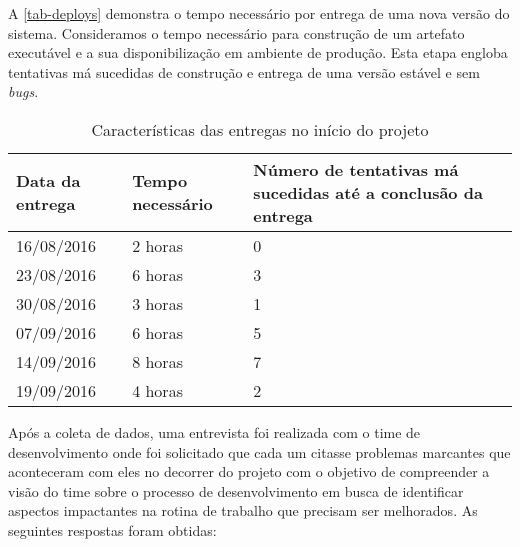 \documentclass[
	12pt,				%
	openright,			%
	oneside,			%
	a4paper,			%
	english,			%
	french,				%
	spanish,			%
	brazil,				%
	]{abntex2}
\begin{document}
A \autoref{tab-deploys} demonstra o tempo necessário por entrega de uma nova versão do sistema. Consideramos o tempo necessário para construção de um artefato executável e a sua disponibilização em ambiente de produção. Esta etapa engloba tentativas má sucedidas de construção e entrega de uma versão estável e sem \textit{bugs}.

\begin{table}[htb]
	\caption{Características das entregas no início do projeto}
	
	\label{tab-deploys}	
	\begin{tabular}{p{3.85cm}|p{5.20cm}|p{5.20cm}}
		\textbf{Data da entrega} & \textbf{Tempo necessário} & \textbf{Número de tentativas má sucedidas até a conclusão da entrega}  \\
		\hline
		16/08/2016 & 2 horas & 0 \\
		\hline
		23/08/2016 & 6 horas & 3 \\
		\hline
		30/08/2016 & 3 horas & 1 \\
		\hline
		07/09/2016 & 6 horas & 5 \\
		\hline
		14/09/2016 & 8 horas & 7 \\
		\hline
		19/09/2016 & 4 horas & 2 \\
	\end{tabular}
\end{table}

Após a coleta de dados, uma entrevista foi realizada com o time de desenvolvimento onde foi solicitado que cada um citasse problemas marcantes que aconteceram com eles no decorrer do projeto com o objetivo de compreender a visão do time sobre o processo de desenvolvimento em busca de identificar aspectos impactantes na rotina de trabalho que precisam ser melhorados. As seguintes respostas foram obtidas:
\end{document}
